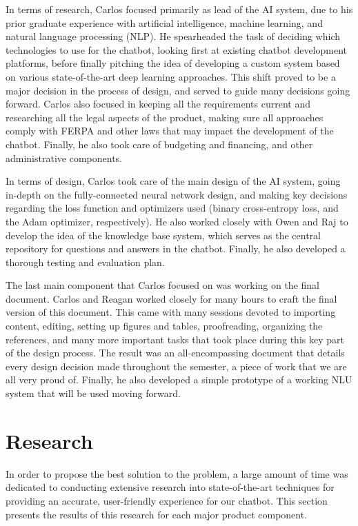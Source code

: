 \documentclass[titlepage, 12pt]{article}
\begin{document}
In terms of research, Carlos focused primarily as lead of the AI system, due to his prior graduate experience with artificial intelligence, machine learning, and natural language processing (NLP). He spearheaded the task of deciding which technologies to use for the chatbot, looking first at existing chatbot development platforms, before finally pitching the idea of developing a custom system based on various state-of-the-art deep learning approaches. This shift proved to be a major decision in the process of design, and served to guide many decisions going forward. Carlos also focused in keeping all the requirements current and researching all the legal aspects of the product, making sure all approaches comply with FERPA and other laws that may impact the development of the chatbot. Finally, he also took care of budgeting and financing, and other administrative components.

In terms of design, Carlos took care of the main design of the AI system, going in-depth on the fully-connected neural network design, and making key decisions regarding the loss function and optimizers used (binary cross-entropy loss, and the Adam optimizer, respectively). He also worked closely with Owen and Raj to develop the idea of the knowledge base system, which serves as the central repository for questions and answers in the chatbot. Finally, he also developed a thorough testing and evaluation plan.

The last main component that Carlos focused on was working on the final document. Carlos and Reagan worked closely for many hours to craft the final version of this document. This came with many sessions devoted to importing content, editing, setting up figures and tables, proofreading, organizing the references, and many more important tasks that took place during this key part of the design process. The result was an all-encompassing document that details every design decision made throughout the semester, a piece of work that we are all very proud of. Finally, he also developed a simple prototype of a working NLU system that will be used moving forward.

\pagebreak



\section{Research}

In order to propose the best solution to the problem, a large amount of time was dedicated to conducting extensive research into state-of-the-art techniques for providing an accurate, user-friendly experience for our chatbot. This section presents the results of this research for each major product component.
\end{document}
